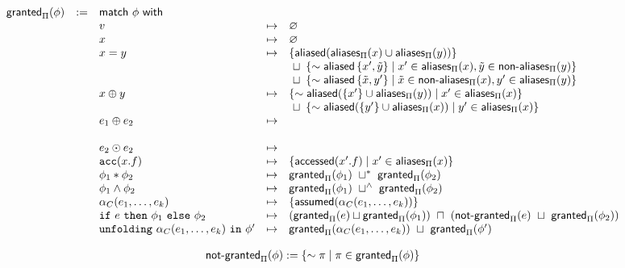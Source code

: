 \begin{align*}
\begin{array}{rclrl}
\tsf{granted}_\Pi(\phi) & := & \tsf{match} \ \phi \ \tsf{with} && \\
%
%
&& v &\mt&
  \empty
\\
&& x &\mt&
  \empty
\\
&& x = y &\mt&
  \set{ \aliased(\aliasesPi(x) \cup \aliasesPi(y)) }
  \\ &&&& \ \merge \
  \set{ \pnot \aliased\set{ x\p, \tilde y }
    \mid x\p \in \aliasesPi(x), \tilde y \in \nonaliasesPi(y) }
  \\ &&&& \ \merge \
  \set{ \pnot \aliased\set{ \tilde x, y\p }
    \mid \tilde x \in \nonaliasesPi(x), y\p \in \aliasesPi(y) }
\\
&& x \oplus y &\mt&
  \set{ \pnot \aliased(\set{ x\p } \cup \aliasesPi(y)) \mid x\p \in \aliasesPi(x) }
  \\ &&&& \ \merge \
  \set{ \pnot \aliased(\set{ y\p } \cup \aliasesPi(x)) \mid y\p \in \aliasesPi(x) }
\\
&& e_1 \oplus e_2 &\mt&
  \\
\\
&& e_2 \odot e_2 &\mt&
\\
&& \cacc(x.f) &\mt&
  \set{ \accessed(x\p.f) \mid x\p \in \aliasesPi(x) }
\\
&& \phi_1 \ast \phi_2 &\mt&
  \tsf{granted}_\Pi(\phi_1) \ \merge^\ast \ \tsf{granted}_\Pi(\phi_2)
\\
&& \phi_1 \land \phi_2 &\mt&
  \tsf{granted}_\Pi(\phi_1) \ \merge^\land \ \tsf{granted}_\Pi(\phi_2)
\\
&& \alpha_C(e_1, \dots, e_k) &\mt&
  \set{ \assumed(\alpha_C(e_1, \dots, e_k)) }
\\
&& \cif \ e \ \cthen \ \phi_1 \ \celse \ \phi_2 &\mt&
  (\tsf{granted}_\Pi(e) \merge \tsf{granted}_\Pi(\phi_1)) \ \overlap \
  (\notgrantedPi(e) \ \merge \ \tsf{granted}_\Pi(\phi_2))
\\
&& \cunfolding \ \alpha_C(e_1, \dots, e_k) \ \cin \ \phi\p &\mt&
  \grantedPi(\alpha_C(e_1, \dots, e_k)) \ \merge \
  \grantedPi(\phi\p)
\end{array}
\end{align*}

\begin{align*}
\textsf{not-granted}_\Pi(\phi) := \left\{  \sim \pi \mid \pi \in \textsf{granted}_\Pi(\phi)  \right\}
\end{align*}

